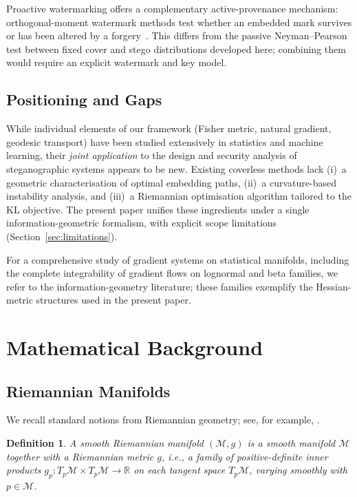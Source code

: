 \documentclass[a4paper,fleqn]{cas-dc}
\newtheorem{definition}{Definition}
\newcommand{\R}{\mathbb{R}}
\newcommand{\calM}{\mathcal{M}}
\begin{document}
Proactive watermarking offers a complementary active-provenance mechanism:
orthogonal-moment watermark methods test whether an embedded mark survives
or has been altered by a forgery~\cite{wang2026focusdeepfakes,
wang2026towardproactive}. This differs from the passive Neyman--Pearson test
between fixed cover and stego distributions developed here; combining them
would require an explicit watermark and key model.

\subsection{Positioning and Gaps}

While individual elements of our framework (Fisher metric, natural
gradient, geodesic transport) have been studied extensively in
statistics and machine learning, their \emph{joint application} to the
design and security analysis of steganographic systems appears to be new.
Existing coverless methods lack (i)~a geometric characterisation of
optimal embedding paths, (ii)~a curvature-based instability analysis,
and (iii)~a Riemannian optimisation algorithm tailored to the KL
objective.
The present paper unifies these ingredients under a single
information-geometric formalism, with explicit scope limitations
(Section~\ref{sec:limitations}).

For a comprehensive study of gradient systems on statistical manifolds,
including the complete integrability of gradient flows on lognormal and
beta families, we refer to the information-geometry literature; these
families exemplify the Hessian-metric structures used in the present
paper.

\section{Mathematical Background}
\label{sec:background}

\subsection{Riemannian Manifolds}

We recall standard notions from Riemannian geometry; see, for example,
\cite{petersen2016riemannian,do2002riemannian,lee2006riemannian}.

\begin{definition}%
  \label{def:riemannian_manifold}
  A \emph{smooth Riemannian manifold} $(\calM, g)$ is a smooth manifold
  $\calM$ together with a \emph{Riemannian metric} $g$, i.e., a family of
  positive-definite inner products
  $g_p : T_p\calM \times T_p\calM \to \R$ on each tangent space $T_p\calM$,
  varying smoothly with $p \in \calM$.
\end{definition}
\end{document}

